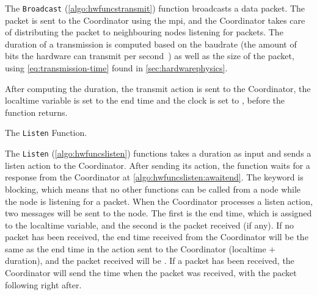 The \texttt{Broadcast} (\autoref{algo:hwfuncstransmit}) function broadcasts a data packet. The packet is sent
to the Coordinator using the \gls{mpi}, and the Coordinator takes care of distributing the packet to
neighbouring nodes listening for packets. The duration of a transmission is computed based on the
\gls{baudrate} (the amount of bits the hardware can transmit per second~\cite{website:baudrate-mathworks}) as
well as the size of the packet, using \autoref{eq:transmission-time} found in \autoref{sec:hardwarephysics}.

After computing the duration, the transmit action is sent to the Coordinator, the localtime variable is set to
the end time and the clock is set to \KwNow, before the function returns. \medbreak

\begin{algorithm}[ht]
    \DontPrintSemicolon
    
    
    \caption{The \texttt{Listen} Function.}
    \label{algo:hwfuncslisten}
\end{algorithm}

The \texttt{Listen} (\autoref{algo:hwfuncslisten}) functions takes a duration as input and sends a listen
action to the Coordinator. After sending its action, the function waits for a response from the Coordinator at
\autoref{algo:hwfuncslisten:awaitend}. The \KwAwait keyword is blocking, which means that no other functions
can be called from a node while the node is listening for a packet. When the Coordinator processes a listen
action, two messages will be sent to the node. The first is the end time, which is assigned to the localtime
variable, and the second is the packet received (if any). If no packet has been received, the end time
received from the Coordinator will be the same as the end time in the action sent to the Coordinator
(localtime $+$ duration), and the packet received will be \KwNull. If a packet has been received, the
Coordinator will send the time when the packet was received, with the packet following right after.

